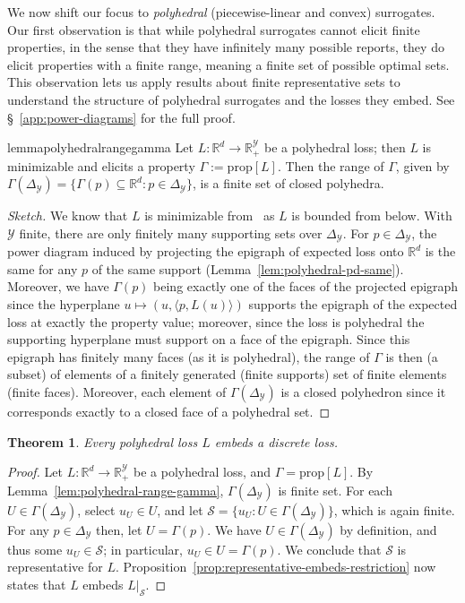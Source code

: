 \documentclass[11pt]{article}
\newcommand{\reals}{\mathbb{R}}
\newcommand{\prop}[1]{\mathrm{prop}[#1]}
\newcommand{\simplex}{\Delta_\Y}
\newcommand{\Sc}{\mathcal{S}}
\newcommand{\Y}{\mathcal{Y}}
\newcommand{\inprod}[2]{\langle #1, #2 \rangle}%
\newtheorem{theorem}{Theorem}
\begin{document}
We now shift our focus to \emph{polyhedral} (piecewise-linear and convex) surrogates.
Our first observation is that while polyhedral surrogates cannot elicit finite properties, in the sense that they have infinitely many possible reports, they do elicit properties with a finite range, meaning a finite set of possible optimal sets.
This observation lets us apply results about finite representative sets to understand the structure of polyhedral surrogates and the losses they embed.
See \S~\ref{app:power-diagrams} for the full proof.

\begin{restatable}{lemma}{polyhedralrangegamma}
	\label{lem:polyhedral-range-gamma}
	Let $L:\reals^d\to\reals_+^\Y$ be a polyhedral loss; then $L$ is minimizable and elicits a property $\Gamma := \prop{L}$.
	Then the range of $\Gamma$, given by $\Gamma(\simplex) = \{\Gamma(p) \subseteq \reals^d : p\in\simplex\}$, is a finite set of closed polyhedra.
\end{restatable}
\begin{proof}[Sketch]
	We know that $L$ is minimizable from~\citet[Corollary 19.3.1]{rockafellar1997convex} as $L$ is bounded from below.
	With $\Y$ finite, there are only finitely many supporting sets over $\simplex$.
	For $p \in \simplex$, the power diagram induced by projecting the epigraph of expected loss onto $\reals^d$ is the same for any $p$ of the same support (Lemma~\ref{lem:polyhedral-pd-same}).
	Moreover, we have $\Gamma(p)$ being exactly one of the faces of the projected epigraph since the hyperplane $u \mapsto (u, \inprod{p}{L(u)})$ supports the epigraph of the expected loss at exactly the property value; moreover, since the loss is polyhedral the supporting hyperplane must support on a face of the epigraph.
	Since this epigraph has finitely many faces (as it is polyhedral), the range of $\Gamma$ is then (a subset) of elements of a finitely generated (finite supports) set of finite elements (finite faces).
	Moreover, each element of $\Gamma(\simplex)$ is a closed polyhedron since it corresponds exactly to a closed face of a polyhedral set.
\end{proof}


\begin{theorem}\label{thm:poly-embeds-discrete}
  Every polyhedral loss $L$ embeds a discrete loss.
\end{theorem}
\begin{proof}
  Let $L:\reals^d\to\reals_+^\Y$ be a polyhedral loss, and $\Gamma = \prop{L}$.
  By Lemma~\ref{lem:polyhedral-range-gamma}, $\Gamma(\simplex)$ is finite set. 
  For each $U\in \Gamma(\simplex)$, select $u_U \in U$, and let $\Sc = \{u_U : U \in\Gamma(\simplex)\}$, which is again finite.
  For any $p\in\simplex$ then, let $U = \Gamma(p)$.
  We have $U \in \Gamma(\simplex)$ by definition, and thus some $u_U \in \Sc$; in particular, $u_U \in U = \Gamma(p)$.
  We conclude that $\Sc$ is representative for $L$.
  Proposition~\ref{prop:representative-embeds-restriction} now states that $L$ embeds $L|_\Sc$.
\end{proof}
\end{document}
